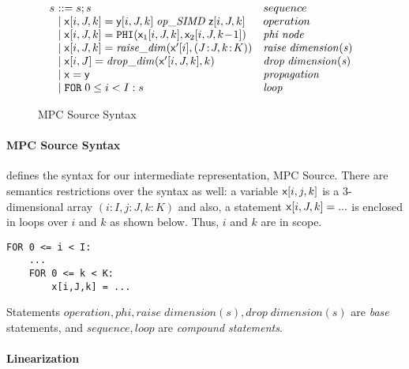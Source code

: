 \begin{figure}%
\[
\begin{array}{l@{~~~~~}l}
  \begin{array}{l@{~}l@{~~~}l}
  s &::= s;s & sequence \\
     & \mid \x[i,J,k] = \y[i,J,k] \; \mathit{op\_SIMD} \; \z[i,J,k] & operation \\
     & \mid \x[i,J,k]  = \texttt{PHI}(\x_1[i,J,k],\x_2[i,J,k\!-\!1]) & \mathit{phi} \; \mathit{node} \\
     & \mid \x[i,J,k] = \mathit{raise\_dim}(\x'[i],(J\!:\!J,k\!:\!K)) & \mathit{raise} \; \mathit{dimension(s)} \\
     & \mid \x[i,J] = \mathit{drop\_dim}(\x'[i,J,k],k)  & \mathit{drop} \; \mathit{dimension(s)} \\
     & \mid \x = \y & \mathit{propagation} \\
     & \mid \texttt{FOR} \; 0 \le i < I: s  & \mathit{loop} \\
  \end{array}    \\
\end{array}
\]
\vspace{-3mm}
\caption{MPC Source Syntax}\label{fig:MPC_Source_syntax}
\vspace{-5mm}
\end{figure}

\paragraph{MPC Source Syntax}

 defines the syntax for our intermediate representation, MPC Source.
There are semantics restrictions over the syntax as well: a variable ${\sf {x}}[i,j,k]$ is a 3-dimensional array
$(i:I,j:J,k:K)$ and also, a statement ${\sf {x}}[i,J,k] = ...$ is enclosed in loops over $i$ and $k$ as shown below.
Thus, $i$ and $k$ are in scope.
\begin{verbatim}
FOR 0 <= i < I:
    ...
    FOR 0 <= k < K:
        x[i,J,k] = ...
\end{verbatim}

Statements $\mathit{operation, phi, raise \; dimension(s), drop \; dimension(s)}$ are \emph{base} statements,
and $\mathit{sequence, loop}$ are \emph{compound statements}.

\paragraph{Linearization}

